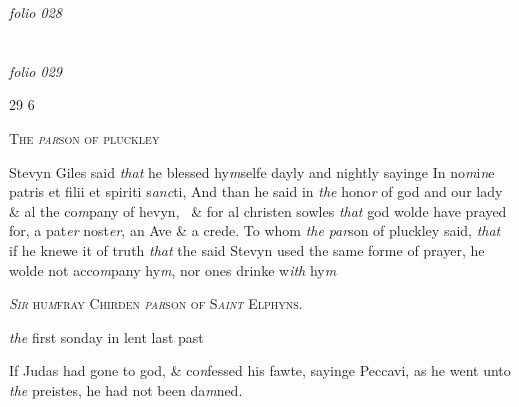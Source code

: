 \documentclass[12pt, a4paper]{book}
\begin{document}

\textit{folio 028}


         \vspace*{4cm}
         
\dotfill
						  \section*{}

\textit{folio 029}
	
	\begin{flushright}{\color{Mahogany}29} 6\end{flushright}

               
				\begin{center} \begin{large} {\scshape The \textit{par}son of pluckley} \end{large} \end{center}
			

	
		\ifthenelse{\isodd{\thepage}}
		{\reversemarginpar}
		{\normalmarginpar}
		Stevyn Giles said \textit{that} he blessed hy\textit{m}selfe dayly and nightly
 sayinge In no\textit{m}i\textit{n}e patris et filii et spiriti s\textit{anc}ti, And than he said
 in \textit{the} hono\textit{r} of god and our lady \& al the co\textit{m}pany of hevyn, 
 \& for al christen sowles \textit{that} god wolde have prayed for,
 a pat\textit{er} nost\textit{er}, an Ave \& a crede. To whom \textit{the}
 	\textit{par}son of pluckley
		said, \textit{that} if he knewe it of truth \textit{that} the said Stevyn
 used the same forme of prayer, he wolde not acco\textit{m}pany
 hy\textit{m}, nor ones drinke w\textit{ith} hy\textit{m} 
 

            
               
				\begin{center} \begin{large} {\scshape 
               	\textit{Sir} hu\textit{m}fray Chirden \textit{par}son of S\textit{aint} Elphyns.
 
                     \textit{the} first sonday in lent last past
               } \end{large} \end{center}
			

 
		\ifthenelse{\isodd{\thepage}}
		{\reversemarginpar}
		{\normalmarginpar}
		If Judas had gone to god, \& co\textit{n}fessed his fawte, sayinge
 Peccavi, as he went unto \textit{the} preistes, he had not
 been da\textit{m}ned.
 
\end{document}
